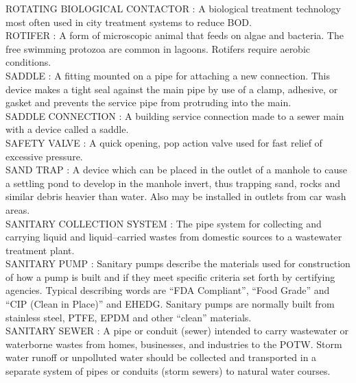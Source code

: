 \vspace{0.15cm}
ROTATING BIOLOGICAL CONTACTOR :   A biological treatment technology most often used in city treatment systems to reduce BOD.\\
\vspace{0.15cm}
ROTIFER :  A form of microscopic animal that feeds on algae and bacteria. The free swimming protozoa are common in lagoons. Rotifers require aerobic conditions.\\
\vspace{0.15cm}
SADDLE :  A fitting mounted on a pipe for attaching a new connection. This device makes a tight seal against the main pipe by use of a clamp, adhesive, or gasket and prevents the service pipe from protruding into the main. \\
\vspace{0.15cm}
SADDLE CONNECTION :  A building service connection made to a sewer main with a device called a saddle. \\
\vspace{0.15cm}
SAFETY VALVE :   A quick opening, pop action valve used for fast relief of excessive pressure.\\
\vspace{0.15cm}
SAND TRAP :  A device which can be placed in the outlet of a manhole to cause a settling pond to develop in the manhole invert, thus trapping sand, rocks and similar debris heavier than water. Also may be installed in outlets from car wash areas. \\
\vspace{0.15cm}
SANITARY COLLECTION SYSTEM :  The pipe system for collecting and carrying liquid and liquid–carried wastes from domestic sources to a wastewater treatment plant. \\
\vspace{0.15cm}
SANITARY PUMP :   Sanitary pumps describe the materials used for construction of how a pump is built and if they meet specific criteria set forth by certifying agencies. Typical describing words are “FDA Compliant”, “Food Grade” and “CIP (Clean in Place)” and EHEDG. Sanitary pumps are normally built from stainless steel, PTFE, EPDM and other “clean” materials.\\
\vspace{0.15cm}
SANITARY SEWER :  A pipe or conduit (sewer) intended to carry wastewater or waterborne wastes from homes, businesses, and industries to the POTW. Storm water runoff or unpolluted water should be collected and transported in a separate system of pipes or conduits (storm sewers) to natural water courses. \\
